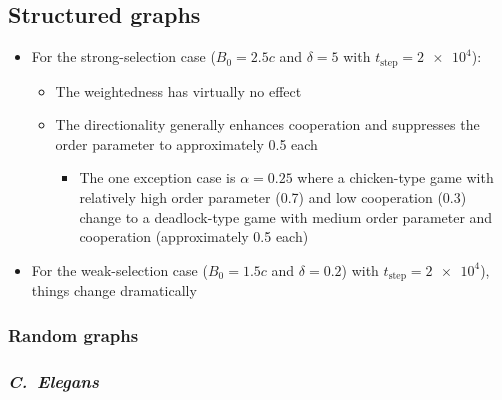 \documentclass[pdflatex,lineno,referee,sn-mathphys-ay]{class/sn-jnl}
\begin{document}
\subsection{Structured graphs}
\begin{itemize}
  \item For the strong-selection case ($B_0 = 2.5c$ and $\delta = 5$
    with $t_{\text{step}} = \num{2e4}$):
  \begin{itemize}
    \item The weightedness has virtually no effect
    \item The directionality generally enhances cooperation
      and suppresses the order parameter to approximately
      \num{0.5} each
    \begin{itemize}
      \item The one exception case is $\alpha = \num{0.25}$ where a
        chicken-type game with relatively high order parameter
        (\num{0.7}) and low cooperation (\num{0.3}) change to a
        deadlock-type game with medium order parameter and cooperation
        (approximately \num{0.5} each)
    \end{itemize}
  \end{itemize}
\item For the weak-selection case ($B_0 = 1.5c$ and $\delta = 0.2$) with
  $t_{\text{step}} = \num{2e4}$), things change dramatically
\end{itemize}
\subsubsection{Random graphs}
\subsubsection{\emph{C.\ Elegans}}
\end{document}
